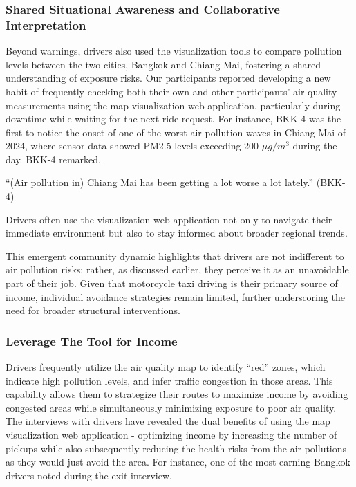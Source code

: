 \subsubsection{Shared Situational Awareness and Collaborative Interpretation}
Beyond warnings, drivers also used the visualization tools to compare pollution levels between the two cities, Bangkok and Chiang Mai, fostering a shared understanding of exposure risks. 
Our participants reported developing a new habit of frequently checking both their own and other participants' air quality measurements using the map visualization web application, particularly during downtime while waiting for the next ride request.
For instance, BKK-4 was the first to notice the onset of one of the worst air pollution waves in Chiang Mai of 2024, where sensor data showed PM2.5 levels exceeding 200 $\mu g/m^3$ during the day. BKK-4 remarked,

\begin{quoteb}
``(Air pollution in) Chiang Mai has been getting a lot worse a lot lately.'' (BKK-4)
\end{quoteb}

Drivers often use the visualization web application not only to navigate their immediate environment but also to stay informed about broader regional trends.

This emergent community dynamic highlights that drivers are not indifferent to air pollution risks; rather, as discussed earlier, they perceive it as an unavoidable part of their job. Given that motorcycle taxi driving is their primary source of income, individual avoidance strategies remain limited, further underscoring the need for broader structural interventions. 

\subsubsection{Leverage The Tool for Income}
Drivers frequently utilize the air quality map to identify ``red'' zones, which indicate high pollution levels, and infer traffic congestion in those areas. This capability allows them to strategize their routes to maximize income by avoiding congested areas while simultaneously minimizing exposure to poor air quality. 
The interviews with drivers have revealed the dual benefits of using the map visualization web application - optimizing income by increasing the number of pickups while also subsequently  reducing the health risks from the air pollutions as they would just avoid the area.
For instance, one of the most-earning Bangkok drivers noted during the exit interview,

